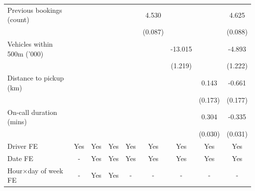 \documentclass[reviewmode]{restud}
\begin{document}
\begin{landscape}
\begin{table}
{\begin{tabular}{l*{8}{S}}
					\addlinespace
					Previous bookings (count)&                     &                     &                     &                     &       4.530&                     &                     &       4.625\\
					&                     &                     &                     &                     &     (0.087)         &                     &                     &     (0.088)         \\
					\addlinespace
					Vehicles within 500m ('000)&                     &                     &                     &                     &                     &     -13.015&                     &      -4.893\\
					&                     &                     &                     &                     &                     &     (1.219)         &                     &     (1.222)         \\
					\addlinespace
					Distance to pickup (km)&                     &                     &                     &                     &                     &                     &       0.143         &      -0.661\\
					&                     &                     &                     &                     &                     &                     &     (0.173)         &     (0.177)         \\
					\addlinespace
					On-call duration (mins)&                     &                     &                     &                     &                     &                     &       0.304&      -0.335\\
					&                     &                     &                     &                     &                     &                     &     (0.030)         &     (0.031)         \\
					\addlinespace
					Driver FE           &       {Yes}         &       {Yes}         &       {Yes}         &       {Yes}         &       {Yes}         &       {Yes}         &       {Yes}         &       {Yes}         \\
					\addlinespace
					Date FE           &       {-}         &       {Yes}         &       {Yes}         &       {Yes}         &       {Yes}         &       {Yes}         &       {Yes}         &       {Yes}         \\
					\addlinespace
					Hour\(\times\)day of week FE&         {-}         &       {Yes}         &       {Yes}         &         {-}         &         {-}         &         {-}         &         {-}         &         {-}         \\

\end{tabular}}
\end{table}
\end{landscape}
\end{document}
